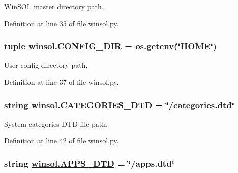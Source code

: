 \hyperlink{classwinsol_1_1WinSOL}{Win\-SOL} master directory path. 



Definition at line 35 of file winsol.py.\hypertarget{namespacewinsol_46eae7a0f9c136c5a878e4877cf346ad}{
\subsubsection[CONFIG\_\-DIR]{\setlength{\rightskip}{0pt plus 5cm}tuple \hyperlink{namespacewinsol_46eae7a0f9c136c5a878e4877cf346ad}{winsol.CONFIG\_\-DIR} = os.getenv(\char`\"{}HOME\char`\"{})}}
\label{namespacewinsol_46eae7a0f9c136c5a878e4877cf346ad}


User config directory path. 



Definition at line 37 of file winsol.py.\hypertarget{namespacewinsol_75406b2652e6bf9dc6b9566a0cb0e517}{
\subsubsection[CATEGORIES\_\-DTD]{\setlength{\rightskip}{0pt plus 5cm}string \hyperlink{namespacewinsol_75406b2652e6bf9dc6b9566a0cb0e517}{winsol.CATEGORIES\_\-DTD} = \char`\"{}/categories.dtd\char`\"{}}}
\label{namespacewinsol_75406b2652e6bf9dc6b9566a0cb0e517}


System categories DTD file path. 



Definition at line 42 of file winsol.py.\hypertarget{namespacewinsol_de0a178fcabafce978c245668b647015}{
\subsubsection[APPS\_\-DTD]{\setlength{\rightskip}{0pt plus 5cm}string \hyperlink{namespacewinsol_de0a178fcabafce978c245668b647015}{winsol.APPS\_\-DTD} = \char`\"{}/apps.dtd\char`\"{}}}
\label{namespacewinsol_de0a178fcabafce978c245668b647015}


